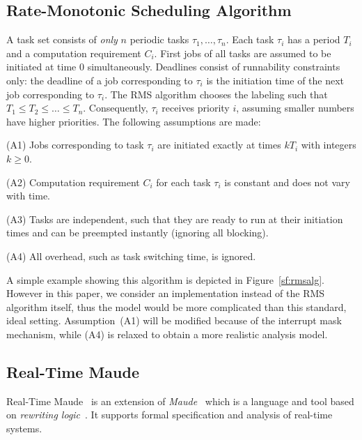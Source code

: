 \documentclass[10pt,journal]{IEEEtran}
\begin{document}
{\subsection{Rate-Monotonic Scheduling Algorithm}
\label{ss:rms}
A task set consists of \emph{only} $n$ periodic tasks
$\tau_1,\ldots,\tau_n$. Each task $\tau_i$ has a period $T_i$ and a
computation requirement $C_i$. First jobs of all tasks are assumed to
be initiated at time $0$ simultaneously.  Deadlines consist of
runnability constraints only: the deadline of a job corresponding to
$\tau_i$ is the initiation time of the next job corresponding to
$\tau_i$.  The RMS algorithm chooses the labeling such that $T_1\le
T_2\le \ldots \le T_n$. Consequently, $\tau_i$ receives priority $i$,
assuming smaller numbers have higher priorities. The following
assumptions are made:

(A1) Jobs corresponding to task $\tau_i$ are initiated exactly at
times $kT_i$ with integers $k\ge 0$.

(A2) Computation requirement $C_i$ for each task $\tau_i$ is constant
and does not vary with time.

(A3) Tasks are independent, such that they are ready to run at their
initiation times and can be preempted instantly (ignoring all
blocking).

(A4) All overhead, such as task switching time, is ignored.

A simple example showing this algorithm is depicted in
Figure~\ref{sf:rmsalg}. However in this paper, we consider an
implementation instead of the RMS algorithm itself, thus the model
would be more complicated than this standard, ideal
setting. Assumption~(A1) will be modified because of the interrupt
mask mechanism, while (A4) is relaxed to obtain a more realistic
analysis model.

\subsection{Real-Time Maude}
Real-Time Maude~\cite{DBLP:journals/lisp/OlveczkyM07} is an extension
of \emph{Maude}~\cite{DBLP:journals/tcs/ClavelDELMMQ02} which is a
language and tool based on \emph{rewriting
  logic}~\cite{DBLP:journals/jlp/Meseguer12}.  It supports formal
specification and analysis of real-time systems.

}
\end{document}
